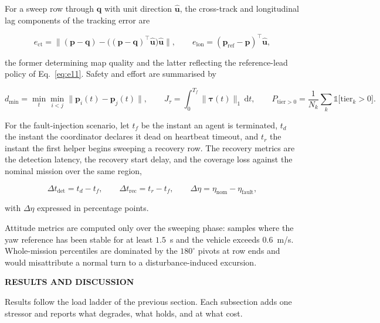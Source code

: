 \documentclass[10pt,letterpaper]{article}
\newcommand{\headingone}[1]{%
    \par\vspace{9pt}%
    {\centering\fontsize{12}{14}\selectfont\bfseries\MakeUppercase{#1}\par}%
    \vspace{4pt}\noindent\ignorespaces}
\begin{document}
For a sweep row through $\mathbf{q}$ with unit direction $\hat{\mathbf{u}}$, the
cross-track and longitudinal lag components of the tracking error are

\begin{equation}
    \label{eq:e38}
    e_{\mathrm{ct}}=\bigl\|(\mathbf{p}-\mathbf{q})-
    \bigl((\mathbf{p}-\mathbf{q})^{\!\top}\hat{\mathbf{u}}\bigr)\hat{\mathbf{u}}\bigr\|,
    \qquad
    e_{\mathrm{lon}}=(\mathbf{p}_{\mathrm{ref}}-\mathbf{p})^{\!\top}\hat{\mathbf{u}},
\end{equation}

the former determining map quality and the latter reflecting the reference-lead policy of
Eq.~\eqref{eq:e11}. Safety and effort are summarised by

\begin{equation}
    \label{eq:e39}
    d_{\min}=\min_{t}\min_{i<j}\|\mathbf{p}_i(t)-\mathbf{p}_j(t)\|,
    \qquad
    J_\tau=\int_0^{T_f}\!\!\|\boldsymbol{\tau}(t)\|_1\,\mathrm{d}t,
    \qquad
    P_{\mathrm{tier}>0}=\frac{1}{N_k}\sum_k \mathbb{1}\bigl[\text{tier}_k>0\bigr].
\end{equation}

For the fault-injection scenario, let $t_f$ be the instant an agent is terminated,
$t_d$ the instant the coordinator declares it dead on heartbeat timeout, and $t_r$ the
instant the first helper begins sweeping a recovery row. The recovery metrics are the
detection latency, the recovery start delay, and the coverage loss against the nominal
mission over the same region,

\begin{equation}
    \Delta t_{\mathrm{det}}=t_d-t_f,
    \qquad
    \Delta t_{\mathrm{rec}}=t_r-t_f,
    \qquad
    \Delta\eta=\eta_{\mathrm{nom}}-\eta_{\mathrm{fault}} ,
\end{equation}

with $\Delta\eta$ expressed in percentage points.

Attitude metrics are computed only over the sweeping phase: samples where the yaw reference
has been stable for at least $1.5$~s and the vehicle exceeds $0.6$~m/s. Whole-mission
percentiles are dominated by the $180^\circ$ pivots at row ends and would misattribute a
normal turn to a disturbance-induced excursion.

\headingone{Results and Discussion}

Results follow the load ladder of the previous section. Each subsection adds one stressor
and reports what degrades, what holds, and at what cost.
\end{document}
